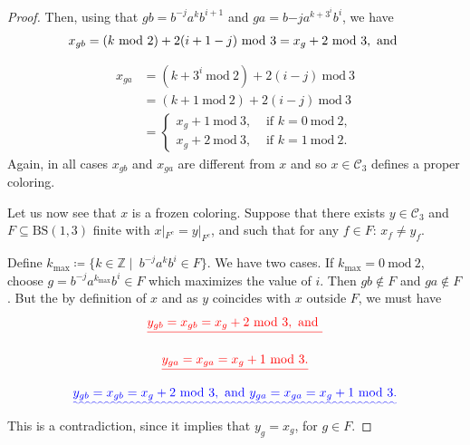 \documentclass[cupthm,crop,info]{CUP-JNL-ETS}%
\theoremstyle{cupplain}
\theoremstyle{cupdefinition}
\theoremstyle{cupremark}
\theoremstyle{cupproof}
\newtheorem{proof}{Proof}
\numberwithin{equation}{section}
\providecommand{\DIFadd}[1]{{\protect\color{blue}\uwave{#1}}} %
\providecommand{\DIFdel}[1]{{\protect\color{red}\sout{#1}}}                      %
\providecommand{\DIFaddbegin}{} %
\providecommand{\DIFaddend}{} %
\providecommand{\DIFdelbegin}{} %
\providecommand{\DIFdelend}{} %
\newcommand{\DIFscaledelfig}{0.5}
\newlength{\DIFdelgraphicswidth} %
\newlength{\DIFdelgraphicsheight} %
\newcommand{\DIFaddincludegraphics}[2][]{{\color{blue}\fbox{\DIFOincludegraphics[#1]{#2}}}} %
\newcommand{\DIFdelincludegraphics}[2][]{%
\sbox{\DIFdelgraphicsbox}{\DIFOincludegraphics[#1]{#2}}%
\settoboxwidth{\DIFdelgraphicswidth}{\DIFdelgraphicsbox} %
\settoboxtotalheight{\DIFdelgraphicsheight}{\DIFdelgraphicsbox} %
\scalebox{\DIFscaledelfig}{%
\parbox[b]{\DIFdelgraphicswidth}{\usebox{\DIFdelgraphicsbox}\\[-\baselineskip] \rule{\DIFdelgraphicswidth}{0em}}\llap{\resizebox{\DIFdelgraphicswidth}{\DIFdelgraphicsheight}{%
\setlength{\unitlength}{\DIFdelgraphicswidth}%
\begin{picture}(1,1)%
\thicklines\linethickness{2pt} %
{\color[rgb]{1,0,0}\put(0,0){\framebox(1,1){}}}%
{\color[rgb]{1,0,0}\put(0,0){\line( 1,1){1}}}%
{\color[rgb]{1,0,0}\put(0,1){\line(1,-1){1}}}%
\end{picture}%
}\hspace*{3pt}}} %
} %
\DeclareRobustCommand{\DIFaddbegin}{\DIFOaddbegin \let\includegraphics\DIFaddincludegraphics} %
\DeclareRobustCommand{\DIFaddend}{\DIFOaddend \let\includegraphics\DIFOincludegraphics} %
\DeclareRobustCommand{\DIFdelbegin}{\DIFOdelbegin \let\includegraphics\DIFdelincludegraphics} %
\DeclareRobustCommand{\DIFdelend}{\DIFOaddend \let\includegraphics\DIFOincludegraphics} %
\begin{document}
\begin{proof}
	
	Then, using that $gb=b^{-j}a^kb^{i+1}$ and \DIFdelbegin \DIFdel{$ga=b{-j}a^{k+3^i}b^{i}$}\DIFdelend \DIFaddbegin \DIFadd{$ga=b^{-j}a^{k+3^i}b^{i}$}\DIFaddend , we have 
	\begin{equation*}
x_{gb}= (k\ \mathrm{mod}\ 2)+2(i+1-j)\ \mathrm{mod}\DIFaddbegin \DIFadd{\ }\DIFaddend 3=x_{g}+2\  \mathrm{mod} \ 3, \text{ and }
	\end{equation*}
\begin{align*}
x_{ga}&=(k+3^{i}\ \mathrm{mod} \ 2)+ 2(i-j) \ \mathrm{mod}\ 3 \\
&=(k+1\ \mathrm{mod} \ 2)+ 2(i-j) \ \mathrm{mod}\ 3\\
&=\left\{\begin{aligned}
x_{g}+1 \ \mathrm{mod}\ 3, &\text{ if }k=0\ \mathrm{mod}\ 2, \\
x_{g}+2 \ \mathrm{mod}\ 3, &\text{ if }k=1\ \mathrm{mod}\ 2.
\end{aligned} \right.
\end{align*}
	Again, in all cases $x_{gb}$ and $x_{ga}$ are different from $x$ and so $x\in \mathcal{C}_3$ defines a proper coloring.

	Let us now see that $x$ is a frozen coloring. Suppose that there exists $y\in \mathcal{C}_3$ and $F\subseteq \mathrm{BS}(1,3)$ finite with $x|_{F^{c}}=y|_{F^{c}}$, and such that for any $f\in F$: $x_f\neq y_f$.

	Define $k_{\mathrm{max}}\coloneqq\{ k\in \mathbb{Z}\mid \ b^{-j}a^kb^i\in F \}$. We have two cases. If $k_\mathrm{max}=0\ \mathrm{mod}\ 2$, choose $g=b^{-j}a^{k_{\mathrm{max}}}b^i\in F$ which maximizes the value of $i$. Then $gb\notin F$ and $ga\notin F$. But the by definition of $x$ and as $y$ coincides with $x$ outside $F$, we must have
	\DIFdelbegin \begin{displaymath}
	\DIFdel{y_{gb}=x_{gb}=x_{g}+2\ \mathrm{mod}\ 3, \text{ and }
	}\end{displaymath}%

\begin{displaymath}
	\DIFdel{y_{ga}=x_{ga}=x_{g}+1\ \mathrm{mod}\ 3.
	}\end{displaymath}%
\DIFdelend \DIFaddbegin \begin{equation*}
	\DIFadd{y_{gb}=x_{gb}=x_{g}+2\ \mathrm{mod}\ 3, \text{ and  } 
	y_{ga}=x_{ga}=x_{g}+1\ \mathrm{mod}\ 3.
	}\end{equation*}\DIFaddend 
	This is a contradiction, since it implies that $y_g=x_g$, for $g\in F$.


\end{proof}
\end{document}

